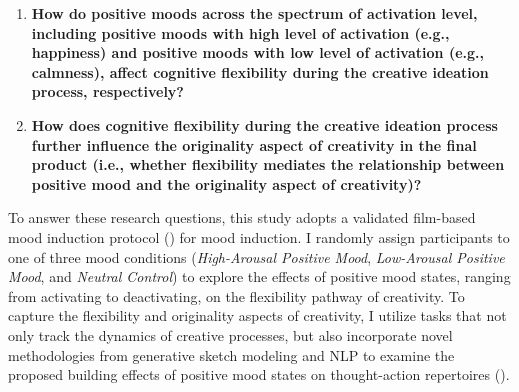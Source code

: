 \documentclass[../MA_Thesis.tex]{subfiles}
\begin{document}
\begin{enumerate}
    \item \textbf{How do positive moods across the spectrum of activation level, including positive moods with high level of activation (e.g., happiness) and positive moods with low level of activation (e.g., calmness), affect cognitive flexibility during the creative ideation process, respectively?}
    \item \textbf{How does cognitive flexibility during the creative ideation process further influence the originality aspect of creativity in the final product (i.e., whether flexibility mediates the relationship between positive mood and the originality aspect of creativity)?}
\end{enumerate}

To answer these research questions, this study adopts a validated film-based mood induction protocol (\cite{siedlecka_experimental_2019}) for mood induction. I randomly assign participants to one of three mood conditions (\textit{High-Arousal Positive Mood}, \textit{Low-Arousal Positive Mood}, and \textit{Neutral Control}) to explore the effects of positive mood states, ranging from activating to deactivating, on the flexibility pathway of creativity. To capture the flexibility and originality aspects of creativity, I utilize tasks that not only track the dynamics of creative processes, but also incorporate novel methodologies from generative sketch modeling and NLP to examine the proposed building effects of positive mood states on thought-action repertoires (\cite{fredrickson_role_2001}). 
\end{document}

